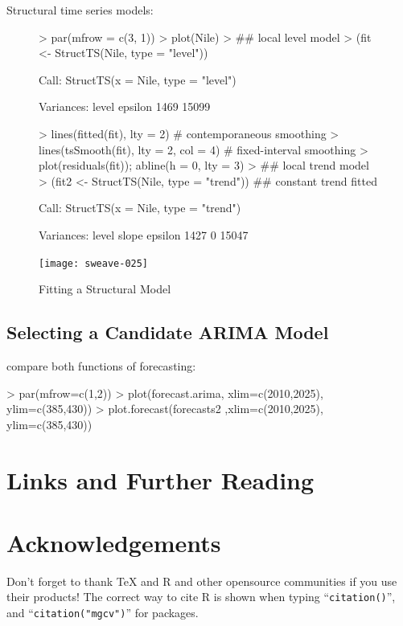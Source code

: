 \documentclass[11pt, a4paper]{article} %
\begin{document}
Structural time series models:
\begin{figure}
\centering
\begin{Schunk}
\begin{Sinput}
> par(mfrow = c(3, 1))
> plot(Nile)
> ## local level model
> (fit <- StructTS(Nile, type = "level"))
\end{Sinput}
\begin{Soutput}
Call:
StructTS(x = Nile, type = "level")

Variances:
  level  epsilon  
   1469    15099  
\end{Soutput}
\begin{Sinput}
> lines(fitted(fit), lty = 2)              # contemporaneous smoothing
> lines(tsSmooth(fit), lty = 2, col = 4)   # fixed-interval smoothing
> plot(residuals(fit)); abline(h = 0, lty = 3)
> ## local trend model
> (fit2 <- StructTS(Nile, type = "trend")) ## constant trend fitted
\end{Sinput}
\begin{Soutput}
Call:
StructTS(x = Nile, type = "trend")

Variances:
  level    slope  epsilon  
   1427        0    15047  
\end{Soutput}
\end{Schunk}
\texttt{[image: sweave-025]}
\caption{Fitting a Structural Model}
\end{figure}

\subsection{Selecting a Candidate ARIMA Model}%


compare both functions of forecasting: 
\begin{Schunk}
\begin{Sinput}
> par(mfrow=c(1,2))
> plot(forecast.arima, xlim=c(2010,2025), ylim=c(385,430))
> plot.forecast(forecasts2 ,xlim=c(2010,2025), ylim=c(385,430))
\end{Sinput}
\end{Schunk}


\section{Links and Further Reading}%
\section{Acknowledgements}%
Don't forget to thank TeX and R and other opensource communities if you use their products! The correct way to cite R is shown when typing ``\texttt{citation()}'', and ``\texttt{citation("mgcv")}'' for packages.

\clearpage
\end{document}
